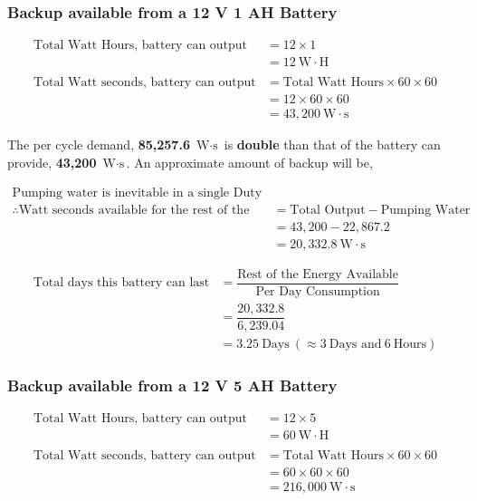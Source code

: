 \documentclass[../main.tex]{subfiles}
\begin{document}
\subsubsection{Backup available from a 12 V 1 AH Battery}

\begin{align*}
    \mbox{Total Watt Hours, battery can output} &= 12 \times 1 \\
    &= 12 \: \mbox{W} \cdot \mbox{H} \\ \\
    \mbox{Total Watt seconds, battery can output} &= \mbox{Total Watt Hours} \times 60 \times 60 \\
    &= 12 \times 60 \times 60 \\
    &= 43,200 \: \mbox{W} \cdot \mbox{s}
\end{align*}

The per cycle demand, \textbf{85,257.6} $\mbox{W} \cdot \mbox{s}$ is
\textbf{double} than that of the battery can provide, \textbf{43,200} $\mbox{W}
\cdot \mbox{s}$. An approximate amount of backup will be,

\begin{align*}
    \mbox{Pumping water is inevitable in a single Duty Cycle.} \\
    \therefore \mbox{Watt seconds available for the rest of the Cycle} &= \mbox{Total Output} - \mbox{Pumping Water} \\
    &= 43,200 - 22,867.2 \\
    &= 20,332.8 \: \mbox{W} \cdot \mbox{s}
\end{align*}

\begin{align*}
    \mbox{Total days this battery can last} &= \dfrac{\mbox{Rest of the Energy Available}}{\mbox{Per Day Consumption}} \\
    &= \dfrac{20,332.8}{6,239.04} \\
    &= 3.25 \: \mbox{Days} \: (\approx 3 \: \mbox{Days and} \: 6 \: \mbox{Hours})
\end{align*}

\subsubsection{Backup available from a 12 V 5 AH Battery}

\begin{align*}
    \mbox{Total Watt Hours, battery can output} &= 12 \times 5 \\
    &= 60 \: \mbox{W} \cdot \mbox{H} \\ \\
    \mbox{Total Watt seconds, battery can output} &= \mbox{Total Watt Hours} \times 60 \times 60 \\
    &= 60 \times 60 \times 60 \\
    &= 216,000 \: \mbox{W} \cdot \mbox{s}
\end{align*}
\end{document}
